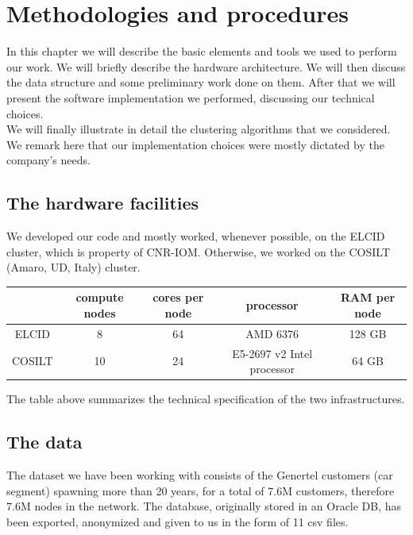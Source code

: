 \documentclass[a4paper,11pt]{book}
\begin{document}
\chapter{Methodologies and procedures}
In this chapter we will describe the basic elements and tools we used to perform our work. We will briefly describe the hardware architecture. We will then discuss the data structure and some preliminary work done on them. After that we will present the software implementation we performed, discussing our technical choices.\\
We will finally illustrate in detail the clustering algorithms that we considered. We remark here that our implementation choices were mostly dictated by the company's needs.
\section{The hardware facilities}
We developed our code and mostly worked, whenever possible, on the ELCID cluster, which is property of CNR-IOM. Otherwise, we worked on the COSILT (Amaro, UD, Italy) cluster.
\begin{center}
\begin{tabular}{||c|c|c|c|c||}
\hline
 \phantom{0} & compute nodes & cores per node & processor & RAM per node\\ 
\hline
ELCID & 8 & 64 & AMD 6376 & 128 GB \\
\hline
COSILT & 10 & 24 & E5-2697 v2 Intel processor & 64 GB \\
\hline
\end{tabular}
\end{center}
The table above summarizes the technical specification of the two infrastructures.
\section{The data}
The dataset we have been working with consists of the Genertel customers (car segment) spawning more than 20 years, for a total of 7.6M customers, therefore 7.6M nodes in the network. The database, originally stored in an Oracle DB, has been exported, anonymized and given to us in the form of 11 csv files.\\
\end{document}
